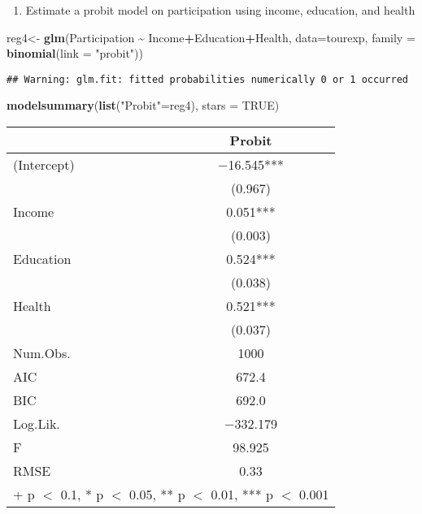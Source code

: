 \documentclass[
]{article}
\newenvironment{Shaded}{\begin{snugshade}}{\end{snugshade}}
\newcommand{\AttributeTok}[1]{\textcolor[rgb]{0.13,0.29,0.53}{#1}}
\newcommand{\ConstantTok}[1]{\textcolor[rgb]{0.56,0.35,0.01}{#1}}
\newcommand{\FunctionTok}[1]{\textcolor[rgb]{0.13,0.29,0.53}{\textbf{#1}}}
\newcommand{\NormalTok}[1]{#1}
\newcommand{\OtherTok}[1]{\textcolor[rgb]{0.56,0.35,0.01}{#1}}
\newcommand{\SpecialCharTok}[1]{\textcolor[rgb]{0.81,0.36,0.00}{\textbf{#1}}}
\newcommand{\StringTok}[1]{\textcolor[rgb]{0.31,0.60,0.02}{#1}}
\providecommand{\tightlist}{%
  \setlength{\itemsep}{0pt}\setlength{\parskip}{0pt}}
\begin{document}
\begin{enumerate}
\def\labelenumi{\alph{enumi})}
\setcounter{enumi}{1}
\tightlist
\item
  Estimate a probit model on participation using income, education, and
  health
\end{enumerate}

\begin{Shaded}
\begin{Highlighting}[]
\NormalTok{reg4}\OtherTok{\textless{}{-}} \FunctionTok{glm}\NormalTok{(Participation }\SpecialCharTok{\textasciitilde{}}\NormalTok{ Income}\SpecialCharTok{+}\NormalTok{Education}\SpecialCharTok{+}\NormalTok{Health, }\AttributeTok{data=}\NormalTok{tourexp, }\AttributeTok{family =} \FunctionTok{binomial}\NormalTok{(}\AttributeTok{link =} \StringTok{"probit"}\NormalTok{))}
\end{Highlighting}
\end{Shaded}

\begin{verbatim}
## Warning: glm.fit: fitted probabilities numerically 0 or 1 occurred
\end{verbatim}

\begin{Shaded}
\begin{Highlighting}[]
\FunctionTok{modelsummary}\NormalTok{(}\FunctionTok{list}\NormalTok{(}\StringTok{"Probit"}\OtherTok{=}\NormalTok{reg4), }\AttributeTok{stars =} \ConstantTok{TRUE}\NormalTok{)}
\end{Highlighting}
\end{Shaded}

\begin{table}
\centering
\begin{tabular}[t]{lc}
\toprule
  & Probit\\
\midrule
(Intercept) & \num{-16.545}***\\
 & (\num{0.967})\\
Income & \num{0.051}***\\
 & (\num{0.003})\\
Education & \num{0.524}***\\
 & (\num{0.038})\\
Health & \num{0.521}***\\
 & (\num{0.037})\\
\midrule
Num.Obs. & \num{1000}\\
AIC & \num{672.4}\\
BIC & \num{692.0}\\
Log.Lik. & \num{-332.179}\\
F & \num{98.925}\\
RMSE & \num{0.33}\\
\bottomrule
\multicolumn{2}{l}{\rule{0pt}{1em}+ p $<$ 0.1, * p $<$ 0.05, ** p $<$ 0.01, *** p $<$ 0.001}\\
\end{tabular}
\end{table}
\end{document}
